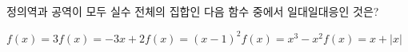 \hspace*{2mm}\begin{minipage}[t]{\dimexpr\linewidth-2mm\relax}\vspace{0pt}
정의역과 공역이 모두 실수 전체의 집합인 다음 함수 중에서 일대일대응인 것은?
\begin{choicesii}{$f(x)=3$}{$f(x)=-3x+2$}{$f(x)=(x-1)^2$}{$f(x)=x^3-x^2$}{$f(x)=x+|x|$}\end{choicesii}\end{minipage}
